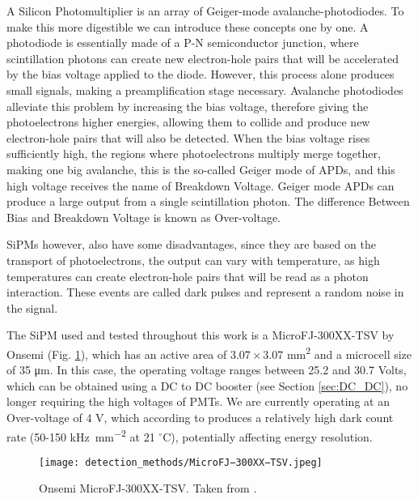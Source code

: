 A Silicon Photomultiplier is an array of Geiger-mode avalanche-photodiodes. To make this more digestible we can introduce these concepts one by one. A photodiode is essentially made of a P-N semiconductor junction, where scintillation photons can create new electron-hole pairs that will be accelerated by the bias voltage applied to the diode. However, this process alone produces small signals, making a preamplification stage necessary. Avalanche photodiodes alleviate this problem by increasing the bias voltage, therefore giving the photoelectrons higher energies, allowing them to collide and produce new electron-hole pairs that will also be detected. When the bias voltage rises sufficiently high, the regions where photoelectrons multiply merge together, making one big avalanche, this is the so-called Geiger mode of APDs, and this high voltage receives the name of Breakdown Voltage. Geiger mode APDs can produce a large output from a single scintillation photon. The difference Between Bias and Breakdown Voltage is known as Over-voltage.

SiPMs however, also have some disadvantages, since they are based on the transport of photoelectrons, the output can vary with temperature, as high temperatures can create electron-hole pairs that will be read as a photon interaction. These events are called dark pulses and represent a random noise in the signal.

The SiPM used and tested throughout this work is a MicroFJ-300XX-TSV by Onsemi \cite{Onsemi_SiPM} (Fig. \ref{fig:Onsemi_SiPM}), which has an active area of $3.07 \times 3.07$ \unit{\mm\squared} and a microcell size of 35 \unit{\micro\m}. In this case, the operating voltage ranges between 25.2 and 30.7 Volts, which can be obtained using a DC to DC booster (see Section \ref{sec:DC_DC}), no longer requiring the high voltages of PMTs. We are currently operating at an Over-voltage of 4 V, which according to \cite{Onsemi_SiPM} produces a relatively high dark count rate (50-150 \unit{\kilo\Hz\per\mm\squared} at 21 $^\circ$C), potentially affecting energy resolution.

\begin{figure}[H]
    \centering
    \texttt{[image: detection\_methods/MicroFJ−300XX−TSV.jpeg]}
    \caption{Onsemi MicroFJ-300XX-TSV. Taken from \cite{Onsemi_SiPM}.}
    \label{fig:Onsemi_SiPM}
\end{figure}